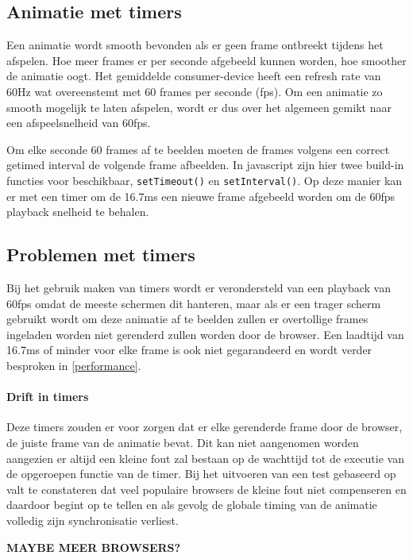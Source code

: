 \subsection{Animatie met timers}

Een animatie wordt smooth bevonden als er geen frame ontbreekt tijdens het afspelen. Hoe meer frames er per seconde afgebeeld kunnen worden, hoe smoother de animatie oogt. Het gemiddelde consumer-device heeft een refresh rate van 60Hz wat overeenstemt met 60 frames per seconde (fps). Om een animatie zo smooth mogelijk te laten afspelen, wordt er dus over het algemeen gemikt naar een afspeelsnelheid van 60fps.

Om elke seconde 60 frames af te beelden moeten de frames volgens een correct getimed interval de volgende frame afbeelden. In javascript zijn hier twee build-in functies voor beschikbaar, \texttt{setTimeout()} en \texttt{setInterval()}. Op deze manier kan er met een timer om de 16.7ms een nieuwe frame afgebeeld worden om de 60fps playback snelheid te behalen.

\subsection{Problemen met timers}
Bij het gebruik maken van timers wordt er verondersteld van een playback van 60fps omdat de meeste schermen dit hanteren, maar als er een trager scherm gebruikt wordt om deze animatie af te beelden zullen er overtollige frames ingeladen worden niet gerenderd zullen worden door de browser. Een laadtijd van 16.7ms of minder voor elke frame is ook niet gegarandeerd en wordt verder besproken in \ref{performance}.

\paragraph{Drift in timers}Deze timers zouden er voor zorgen dat er elke gerenderde frame door de browser, de juiste frame van de animatie bevat. Dit kan niet aangenomen worden aangezien er altijd een kleine fout zal bestaan op de wachttijd tot de executie van de opgeroepen functie van de timer. Bij het uitvoeren van een test gebaseerd op \cite{testDrift} valt te constateren dat veel populaire browsers de kleine fout niet compenseren en daardoor begint op te tellen en als gevolg de globale timing van de animatie volledig zijn synchronisatie verliest.

\textbf{MAYBE MEER BROWSERS?}

